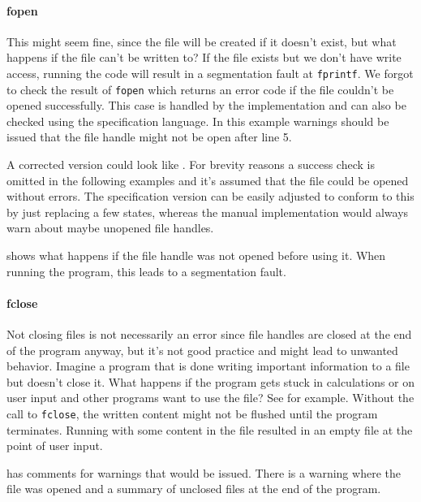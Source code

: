 \paragraph*{fopen}
This might seem fine, since the file will be created if it doesn't exist, but what happens if the file can't be written to?
If the file exists but we don't have write access, running the code will result in a segmentation fault at \verb|fprintf|.
We forgot to check the result of \verb|fopen| which returns an error code if the file couldn't be opened successfully.
This case is handled by the implementation and can also be checked using the specification language. In this example warnings should be issued that the file handle might not be open after line 5.

A corrected version could look like .
For brevity reasons a success check is omitted in the following examples and it's assumed that the file could be opened without errors. The specification version can be easily adjusted to conform to this by just replacing a few states, whereas the manual implementation would always warn about maybe unopened file handles.

 shows what happens if the file handle was not opened before using it. When running the program, this leads to a segmentation fault.

\paragraph*{fclose}
Not closing files is not necessarily an error since file handles are closed at the end of the program anyway, but it's not good practice and might lead to unwanted behavior.
Imagine a program that is done writing important information to a file but doesn't close it. What happens if the program gets stuck in calculations or on user input and other programs want to use the file? See  for example. Without the call to \verb|fclose|, the written content might not be flushed until the program terminates. Running with some content in the file resulted in an empty file at the point of user input.

 has comments for warnings that would be issued. There is a warning where the file was opened and a summary of unclosed files at the end of the program.

